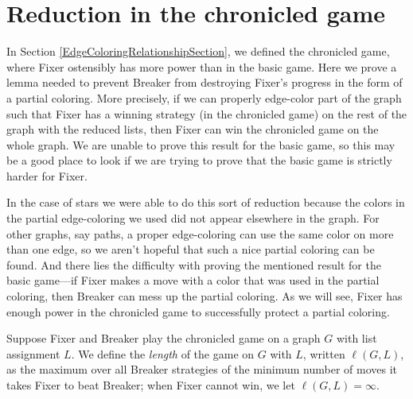 \documentclass[12pt,reqno]{amsart}
\theoremstyle{plain}
\theoremstyle{definition}
\theoremstyle{remark}
\begin{document}
\section{Reduction in the chronicled game}
In Section \ref{EdgeColoringRelationshipSection}, we defined the chronicled
game, where Fixer ostensibly has more power than in the basic game.  Here we
prove a lemma needed to prevent Breaker from destroying Fixer's progress in the
form of a partial coloring.  More precisely, if we can properly edge-color part
of the graph such that Fixer has a winning strategy (in the chronicled game) on
the rest of the graph with the reduced lists, then Fixer can win the chronicled
game on the whole graph.  We are unable to prove this result for the basic
game, so this may be a good place to look if we are trying to prove that the
basic game is strictly harder for Fixer.

In the case of stars we were able to do this sort of reduction because the colors in the partial edge-coloring we used did not appear elsewhere in the graph.  For other graphs, say paths, a proper edge-coloring can use the same color on more than one edge, so we aren't hopeful that such a nice partial coloring can be found.  And there lies the difficulty with proving the mentioned result for the basic game---if Fixer makes a move with a color that was used in the partial coloring, then Breaker can mess up the partial coloring.  As we will see, Fixer has enough power in the chronicled game to successfully protect a partial coloring.

Suppose Fixer and Breaker play the chronicled game on a graph $G$ with list assignment $L$. We define the \emph{length} of the game on $G$ with $L$, written $\ell(G, L)$, as the maximum over all Breaker strategies of the minimum number of moves it takes Fixer to beat Breaker; when Fixer cannot win, we let $\ell(G, L) = \infty$.  
\end{document}

